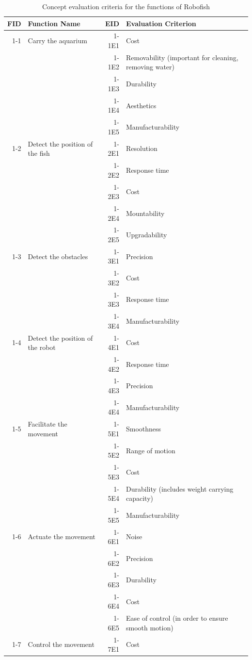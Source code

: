 \documentclass[a4paper, 10pt, DIV=16, parskip = full, twocolumn = false]{scrartcl}
\begin{document}
\begin{table}
	\centering
	\caption{Concept evaluation criteria for the functions of Robofish}
	\begin{tabular}{rlrl}
		\toprule
		FID & Function Name & EID & Evaluation Criterion \\
		\midrule
		1-1 & Carry the aquarium & 1-1E1 & Cost\\	
		& & 1-1E2 & Removability (important for cleaning, removing water)\\	
		& & 1-1E3 & Durability \\	
		& & 1-1E4 & Aesthetics \\	
		& & 1-1E5 & Manufacturability \\	
		1-2 & Detect the position of the fish & 1-2E1 & Resolution \\
		& & 1-2E2 & Response time \\	
		& & 1-2E3 & Cost \\	
		& & 1-2E4 & Mountability \\	
		& & 1-2E5 & Upgradability \\	
		1-3 & Detect the obstacles & 1-3E1 & Precision \\
		& & 1-3E2 & Cost \\	
		& & 1-3E3 & Response time \\
		& & 1-3E4 & Manufacturability \\
		1-4 & Detect the position of the robot & 1-4E1 & Cost \\
		& & 1-4E2 & Response time \\	
		& & 1-4E3 & Precision \\
		& & 1-4E4 & Manufacturability \\
		1-5 & Facilitate the movement & 1-5E1 & Smoothness \\
		& & 1-5E2 & Range of motion \\	
		& & 1-5E3 & Cost  \\
		& & 1-5E4 & Durability (includes weight carrying capacity) \\	
		& & 1-5E5 & Manufacturability \\
		1-6 & Actuate the movement & 1-6E1 & Noise \\
		& & 1-6E2 & Precision \\	
		& & 1-6E3 & Durability \\
		& & 1-6E4 & Cost \\
		& & 1-6E5 & Ease of control (in order to ensure smooth motion) \\
		1-7 & Control the movement & 1-7E1 & Cost \\

\end{tabular}
\end{table}
\end{document}
